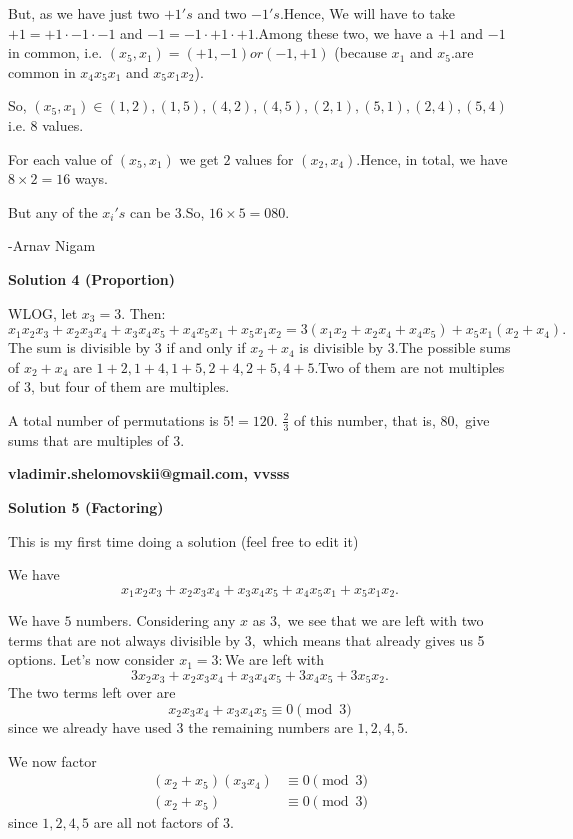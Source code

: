 \begin{enumerate}
 But, as we have just two $+1's$ and two $-1's$.Hence, We will have to take $+1 = +1 \cdot -1 \cdot -1$ and $-1 = -1 \cdot +1 \cdot +1$.Among these two, we have a $+1$ and $-1$ in common, i.e. $(x_{5}, x_{1}) = (+1, -1) or (-1, +1)$ (because $x_{1}$ and $x_{5}$.are common in $x_{4}x_{5}x_{1}$ and $x_{5}x_{1}x_{2}$).

 So, $(x_{5}, x_{1}) \in {(1,2), (1,5), (4,2), (4,5), (2,1), (5,1), (2,4), (5,4)}$ i.e. $8$ values.

 For each value of $(x_{5}, x_{1})$ we get $2$ values for $(x_{2}, x_{4})$.Hence, in total, we have $8 \times 2 = 16$ ways.

 But any of the $x_{i} 's$ can be $3$.So, $16 \times 5 = \boxed{080}$.

 -Arnav Nigam

 



\textbf{Solution 4 (Proportion)}

WLOG, let $x_{3} = 3$. Then:
 \[x_{1}x_{2}x_{3} + x_{2}x_{3}x_{4} + x_{3}x_{4}x_{5} + x_{4}x_{5}x_{1} + x_{5}x_{1}x_{2} = 3 (x_1 x_2 + x_2 x_4 + x_4 x_5) + x_5 x_1 (x_2  + x_4).\]The sum is divisible by $3$ if and only if  $x_2  + x_4$  is divisible by $3$.The possible sums of  $x_2  + x_4$ are $1 + 2, 1 + 4, 1 + 5, 2 + 4, 2 + 5, 4 + 5.$Two of them are not multiples of $3$, but four of them are multiples.

 A total number of  permutations is $5! = 120.$
$\frac {2}{3}$ of this number, that is, $80,$ give sums that are multiples of $3.$

 \textbf{vladimir.shelomovskii@gmail.com, vvsss}

 



\textbf{Solution 5 (Factoring)}

This is my first time doing a solution (feel free to edit it)

 We have 
 \[x_1x_2x_3 + x_2x_3x_4 + x_3x_4x_5 + x_4x_5x_1 + x_5x_1x_2.\]

 We have $5$ numbers. Considering any $x$ as $3,$ we see that we are left with two terms that are not always divisible by $3,$ which means that already gives us 5 options. Let's now consider $x_1 =3:$We are left with 
 \[3x_2x_3 + x_2x_3x_4 + x_3x_4x_5 + 3x_4x_5 + 3x_5x_2.\]The two terms left over are 
 \[x_2x_3x_4 + x_3x_4x_5 \equiv 0 \pmod{3}\]since we already have used $3$ the remaining numbers are $1,2,4,5.$

 We now factor 
 \begin{align*} (x_2 + x_5)(x_3x_4) &\equiv 0 \pmod{3} \\ (x_2 + x_5) &\equiv 0 \pmod{3} \end{align*}
since $1,2,4,5$ are all not factors of $3.$


\end{enumerate}
